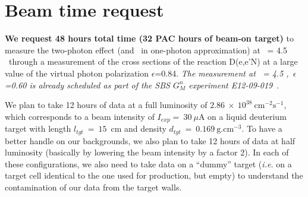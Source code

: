 \section{Beam time request}

{\bf We request 48 hours total time (32 PAC hours of beam-on target)} to measure the two-photon effect (and \gen~in one-photon approximation) 
at \qsq~= 4.5 \gevcsq~through a measurement of the cross sections of the reaction D(e,e'N) at a large value of the virtual photon polarization $\epsilon$=0.84.
{\em The measurement at \qsq~= 4.5 \gevcsq,~$\epsilon$=0.60 is already scheduled as part of the SBS $G_M^n$ experiment E12-09-019}~\cite{E12-09-019}.

We plan to take 12 hours of data at a full luminosity of $2.86~\times~10^{38}~\mathrm{cm}^{-2}\mathrm{s}^{-1}$, which corresponds to a beam intensity of $I_{exp} =~30~\mu$A on a liquid deuterium target with length $l_{tgt}~=~15$~cm and density $d_{tgt}~=~0.169~\mathrm{g.cm}^{-3}$. 
To have a better handle on our backgrounds, we also plan to take 12 hours of data at half luminosity (basically by lowering the beam intensity by a factor 2).
In each of these configurations, we also need to take data on a ``dummy'' target ({\it i.e.} on a target cell identical to the one used for production, but empty) to understand the contamination of our data from the target walls.

